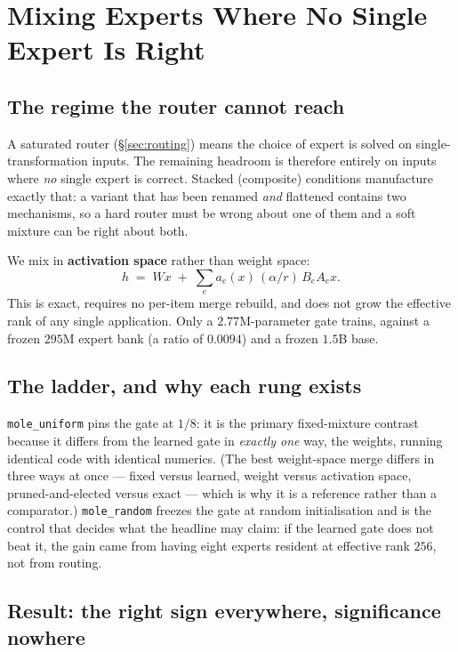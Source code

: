 \documentclass[sigconf,review,anonymous]{acmart}
\newcommand{\arm}[1]{\texttt{#1}}
\begin{document}
\section{Mixing Experts Where No Single Expert Is Right}
\label{sec:mixture}

\subsection{The regime the router cannot reach}

A saturated router (\S\ref{sec:routing}) means the choice of expert is solved on
single-transformation inputs. The remaining headroom is therefore entirely on inputs where
\emph{no} single expert is correct. Stacked (composite) conditions manufacture exactly that: a
variant that has been renamed \emph{and} flattened contains two mechanisms, so a hard router must
be wrong about one of them and a soft mixture can be right about both.

We mix in \textbf{activation space} rather than weight space:
\[
h \;=\; Wx \;+\; \sum_{e} a_e(x)\,(\alpha/r)\,B_e A_e x .
\]
This is exact, requires no per-item merge rebuild, and does not grow the effective rank of any
single application. Only a $2.77$M-parameter gate trains, against a frozen $295$M expert bank
(a ratio of $0.0094$) and a frozen $1.5$B base.

\subsection{The ladder, and why each rung exists}

\arm{mole\_uniform} pins the gate at $1/8$: it is the primary fixed-mixture contrast because it
differs from the learned gate in \emph{exactly one} way, the weights, running identical code with
identical numerics. (The best weight-space merge differs in three ways at once --- fixed versus
learned, weight versus activation space, pruned-and-elected versus exact --- which is why it is a
reference rather than a comparator.) \arm{mole\_random} freezes the gate at random
initialisation and is the control that decides what the headline may claim: if the learned gate
does not beat it, the gain came from having eight experts resident at effective rank $256$, not
from routing.

\subsection{Result: the right sign everywhere, significance nowhere}
\end{document}
